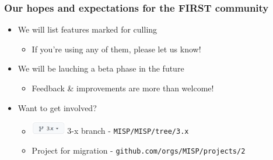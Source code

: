 \begin{frame}
    \frametitle{Our hopes and expectations for the FIRST community}
    \begin{itemize}
        \item We will list features marked for culling
        \begin{itemize}
            \item If you're using any of them, please let us know!
        \end{itemize}
        \item We will be lauching a beta phase in the future
        \begin{itemize}
            \item Feedback \& improvements are more than welcome!
        \end{itemize}
        \item Want to get involved?
        \begin{itemize}
            \item \includegraphics[width=4em]{pictures/3x-branch.png} 3-x branch - \texttt{\scriptsize MISP/MISP/tree/3.x}
            \item {} Project for migration - \texttt{\scriptsize github.com/orgs/MISP/projects/2}
        \end{itemize}
    \end{itemize}
\end{frame}
